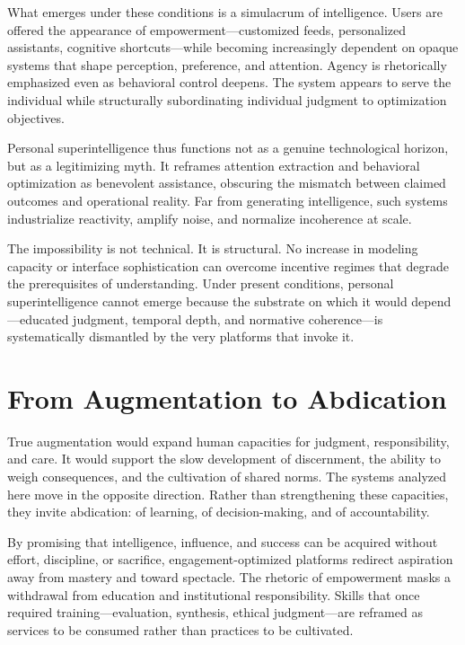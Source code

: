 \documentclass[12pt]{article}
\begin{document}
What emerges under these conditions is a simulacrum of intelligence. Users are offered the appearance of empowerment—customized feeds, personalized assistants, cognitive shortcuts—while becoming increasingly dependent on opaque systems that shape perception, preference, and attention. Agency is rhetorically emphasized even as behavioral control deepens. The system appears to serve the individual while structurally subordinating individual judgment to optimization objectives.

Personal superintelligence thus functions not as a genuine technological horizon, but as a legitimizing myth. It reframes attention extraction and behavioral optimization as benevolent assistance, obscuring the mismatch between claimed outcomes and operational reality. Far from generating intelligence, such systems industrialize reactivity, amplify noise, and normalize incoherence at scale.

The impossibility is not technical. It is structural. No increase in modeling capacity or interface sophistication can overcome incentive regimes that degrade the prerequisites of understanding. Under present conditions, personal superintelligence cannot emerge because the substrate on which it would depend—educated judgment, temporal depth, and normative coherence—is systematically dismantled by the very platforms that invoke it.

\section{From Augmentation to Abdication}

True augmentation would expand human capacities for judgment, responsibility, and care. It would support the slow development of discernment, the ability to weigh consequences, and the cultivation of shared norms. The systems analyzed here move in the opposite direction. Rather than strengthening these capacities, they invite abdication: of learning, of decision-making, and of accountability.

By promising that intelligence, influence, and success can be acquired without effort, discipline, or sacrifice, engagement-optimized platforms redirect aspiration away from mastery and toward spectacle. The rhetoric of empowerment masks a withdrawal from education and institutional responsibility. Skills that once required training—evaluation, synthesis, ethical judgment—are reframed as services to be consumed rather than practices to be cultivated.
\end{document}
